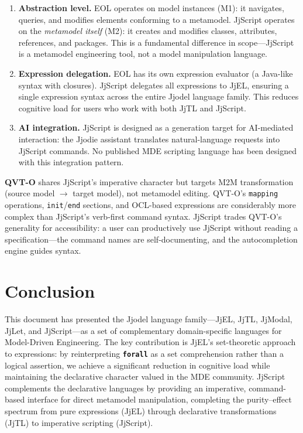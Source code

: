 \documentclass[11pt,a4paper]{article}
\newcommand{\jjmodal}{\textsf{JjModal}}
\newcommand{\jjlet}{\textsf{JjLet}}
\newcommand{\jjscript}{\textsf{JjScript}}
\newcommand{\jjel}{\textsf{JjEL}}
\newcommand{\jjtl}{\textsf{JjTL}}
\newcommand{\kw}[1]{\texttt{\textbf{#1}}}
\begin{document}
\begin{enumerate}
    \item \textbf{Abstraction level.} EOL operates on model instances (M1):
          it navigates, queries, and modifies elements conforming to a
          metamodel. \jjscript{} operates on the \emph{metamodel itself}
          (M2): it creates and modifies classes, attributes, references, and
          packages. This is a fundamental difference in scope---\jjscript{}
          is a metamodel engineering tool, not a model manipulation language.
    \item \textbf{Expression delegation.} EOL has its own expression
          evaluator (a Java-like syntax with closures). \jjscript{}
          delegates all expressions to \jjel{}, ensuring a single expression
          syntax across the entire Jjodel language family. This reduces
          cognitive load for users who work with both \jjtl{} and
          \jjscript{}.
    \item \textbf{AI integration.} \jjscript{} is designed as a generation
          target for AI-mediated interaction: the Jjodie assistant
          translates natural-language requests into \jjscript{} commands.
          No published MDE scripting language has been designed with this
          integration pattern.
\end{enumerate}

\textbf{QVT-O} shares \jjscript{}'s imperative character but targets M2M
transformation (source model $\to$ target model), not metamodel editing.
QVT-O's \texttt{mapping} operations, \texttt{init}/\texttt{end} sections,
and OCL-based expressions are considerably more complex than \jjscript{}'s
verb-first command syntax. \jjscript{} trades QVT-O's generality for
accessibility: a user can productively use \jjscript{} without reading a
specification---the command names are self-documenting, and the
autocompletion engine guides syntax.


\section{Conclusion}\label{sec:conclusion}

This document has presented the Jjodel language family---\jjel{}, \jjtl{}, \jjmodal{}, \jjlet{}, and \jjscript{}---as a set of complementary domain-specific languages for Model-Driven Engineering. The key contribution is \jjel{}'s set-theoretic approach to expressions: by reinterpreting \kw{forall} as a set comprehension rather than a logical assertion, we achieve a significant reduction in cognitive load while maintaining the declarative character valued in the MDE community. \jjscript{} complements the declarative languages by providing an imperative, command-based interface for direct metamodel manipulation, completing the purity--effect spectrum from pure expressions (\jjel{}) through declarative transformations (\jjtl{}) to imperative scripting (\jjscript{}).
\end{document}
